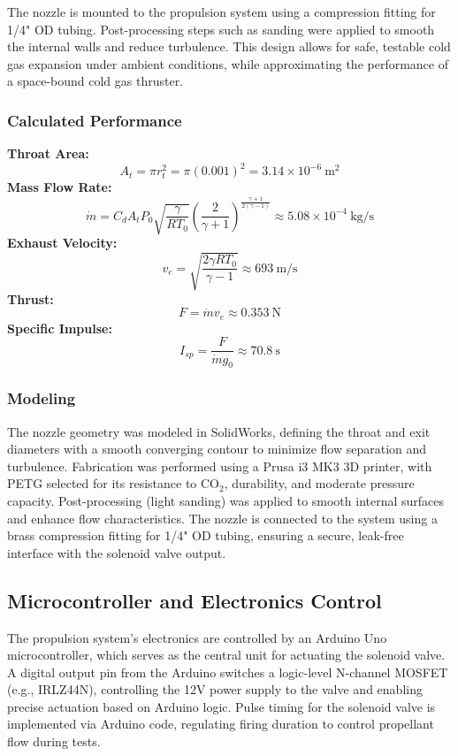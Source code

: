 \documentclass{new-aiaa}
\begin{document}
\vspace{0.5em}
\noindent

\vspace{0.5em}
\noindent
The nozzle is mounted to the propulsion system using a compression fitting for 1/4" OD tubing. Post-processing steps such as sanding were applied to smooth the internal walls and reduce turbulence. This design allows for safe, testable cold gas expansion under ambient conditions, while approximating the performance of a space-bound cold gas thruster.


\subsubsection{Calculated Performance}
\noindent\textbf{Throat Area:}
\[
A_t = \pi r_t^2 = \pi (0.001)^2 = 3.14 \times 10^{-6} \ \text{m}^2
\]
\noindent\textbf{Mass Flow Rate:}
\[
\dot{m} = C_d A_t P_0 \sqrt{\frac{\gamma}{R T_0}} \left( \frac{2}{\gamma+1} \right)^{\frac{\gamma+1}{2(\gamma-1)}} \approx 5.08 \times 10^{-4} \ \text{kg/s}
\]
\noindent\textbf{Exhaust Velocity:}
\[
v_e = \sqrt{\frac{2 \gamma R T_0}{\gamma - 1}} \approx 693 \ \text{m/s}
\]
\noindent\textbf{Thrust:}
\[
F = \dot{m} v_e \approx 0.353 \ \text{N}
\]
\noindent\textbf{Specific Impulse:}
\[
I_{sp} = \frac{F}{\dot{m} g_0} \approx 70.8 \ \text{s}
\]

\subsubsection{Modeling}
The nozzle geometry was modeled in SolidWorks, defining the throat and exit diameters with a smooth converging contour to minimize flow separation and turbulence. Fabrication was performed using a Prusa i3 MK3 3D printer, with PETG selected for its resistance to CO$_2$, durability, and moderate pressure capacity. Post-processing (light sanding) was applied to smooth internal surfaces and enhance flow characteristics. The nozzle is connected to the system using a brass compression fitting for 1/4" OD tubing, ensuring a secure, leak-free interface with the solenoid valve output.



\subsection{Microcontroller and Electronics Control}

The propulsion system’s electronics are controlled by an Arduino Uno microcontroller, which serves as the central unit for actuating the solenoid valve. A digital output pin from the Arduino switches a logic-level N-channel MOSFET (e.g., IRLZ44N), controlling the 12V power supply to the valve and enabling precise actuation based on Arduino logic. Pulse timing for the solenoid valve is implemented via Arduino code, regulating firing duration to control propellant flow during tests.
\end{document}
